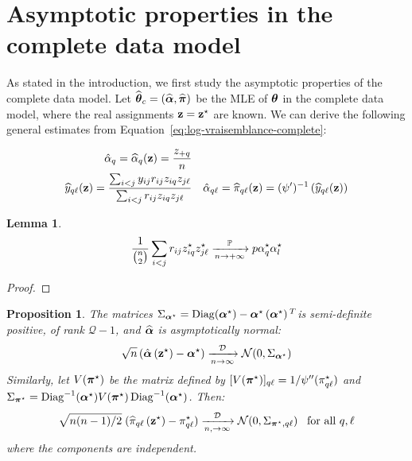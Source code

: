 \documentclass[]{imsart}
\newcommand{\1}{\mathds{1}}
\numberwithin{equation}{section}
\theoremstyle{plain}
\newtheorem{proposition}[thm]{Proposition}
\newtheorem{lemme}[thm]{Lemma}
\theoremstyle{remark}
\begin{document}
\section{Asymptotic properties in the complete data model}
\label{sec:mle-complete-likelihood}
As stated in the introduction, we first study the asymptotic properties of the complete data model.
Let $\widehat{\boldsymbol{\theta}}_{c}=\left(\widehat{\boldsymbol{\alpha}},\widehat{\boldsymbol{\pi}}\right)$ be the MLE of $\boldsymbol{\theta}$ in the complete data model, where the real assignments $\mathbf{z}=\mathbf{z}^\star$ are known. We can derive the following general estimates from Equation~\eqref{eq:log-vraisemblance-complete}:

\begin{equation}
  \label{eq:mle-complete-likelihood}
  \begin{aligned}
    \hpi_{q}  = \pizq = \frac{\zsumq}{\n} & \\
    \hyqlz = \frac{\sum_{\ii < \jj} \yij r_{ij} \ziq \zjl}{\sum_{\ii < \jj} r_{ij} \ziq \zjl} & \quad
    \hpi_{q\el}  = \pizql = \normpm \left(  \hyqlz \right)
  \end{aligned}
\end{equation}

\begin{lemme}
$$\frac{1}{\binom{n}{2}}\sum_{i < j} r_{ij} z_{i q}^\star z_{j\ell}^\star \xrightarrow[n \to +\infty]{\mathbb{P}} p \alpha^\star_{q}\alpha^\star_{l}$$
\end{lemme}
\begin{proof}

\end{proof}



\begin{proposition}
  \label{prop:mle-asymptotic-normality}
  The matrices $\Sigma_{\boldsymbol{\alpha}^\star} = \operatorname{Diag}(\boldsymbol{\alpha}^\star) - \boldsymbol{\alpha}^\star\left(\boldsymbol{\alpha}^\star\right){^{T}} $is semi-definite positive, of rank $\mathcal{Q}-1$, and $\widehat{\boldsymbol{\alpha}}$ is asymptotically normal:
  \begin{equation}
    \label{eq:mle-proportion-asymptotic-normality}
    \sqrt{\n}\left( \hat{\bpi}\left(\bzs\right) - \bpis \right) \xrightarrow[\n \to \infty]{\mathcal{D}} \mathcal{N}(0, \Sigma_{\bpis})
  \end{equation}
Similarly, let $V(\boldsymbol{\pi}^\star)$ be the matrix defined by $[V(\boldsymbol{\pi}^\star)]_{q \ell} = 1/\psi''(\pi^\star_{q\ell})$ and\\  $\Sigma_{\boldsymbol{\pi}^\star} = \operatorname{Diag}^{-1}(\boldsymbol{\alpha}^\star) V(\boldsymbol{\pi}^\star) \operatorname{Diag}^{-1}(\boldsymbol{\alpha}^\star)$. Then:
  \begin{equation}
    \label{eq:mle-parameters-asymptotic-normality}
    \sqrt{\n(\n-1)/2}\;(\hal_{q\el}\left(\bzs\right) - \pi^\vrai_{q\el}) \xrightarrow[\n, \to \infty]{\mathcal{D}}  \mathcal{N}(0, \Sigma_{\bals, q \el})\;\;\; \hbox{for all  } q, \el
  \end{equation}
  where the components are independent. 
\end{proposition}
\end{document}
